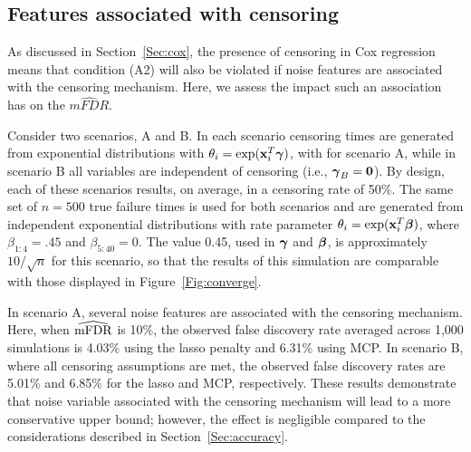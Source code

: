 \subsection{Features associated with censoring}

As discussed in Section~\ref{Sec:cox}, the presence of censoring in Cox regression means that condition (A2) will also be violated if noise features are associated with the censoring mechanism.  Here, we assess the impact such an association has on the $\widehat{mFDR}$.

Consider two scenarios, A and B. In each scenario censoring times are generated from exponential distributions with $\theta_{i} = \exp(\mathbf{x}_i^T \boldsymbol{\gamma})$, with
for scenario A, while in scenario B all variables are independent of censoring (i.e., $\boldsymbol{\gamma}_B = \mathbf{0}$).  By design, each of these scenarios results, on average, in a censoring rate of 50\%.  The same set of $n = 500$ true failure times is used for both scenarios and are generated from independent exponential distributions with rate parameter $\theta_i = \exp(\mathbf{x}_i^T \boldsymbol{\beta})$, where $\beta_{1:4} = .45$ and $\beta_{5:40} = 0$.  The value 0.45, used in $\boldsymbol{\gamma}$ and $\boldsymbol{\beta}$, is approximately $10/\sqrt{n}$ for this scenario, so that the results of this simulation are comparable with those displayed in Figure~\ref{Fig:converge}.



In scenario A, several noise features are associated with the censoring mechanism.  Here, when $\widehat{\textrm{mFDR}}$ is 10\%, the observed false discovery rate averaged across 1,000 simulations is 4.03\% using the lasso penalty and 6.31\% using MCP.  In scenario B, where all censoring assumptions are met, the observed false discovery rates are 5.01\% and 6.85\% for the lasso and MCP, respectively.  These results demonstrate that noise variable associated with the censoring mechanism will lead to a more conservative upper bound; however, the effect is negligible compared to the considerations described in Section~\ref{Sec:accuracy}.

